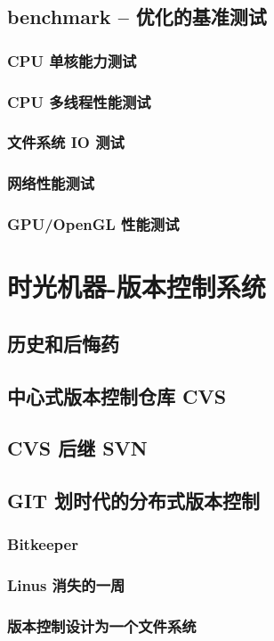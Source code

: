 \documentclass[amstex,twoside]{ctexbook}
\begin{document}
\section{  benchmark – 优化的基准测试}
\subsection{  CPU 单核能力测试}
\subsection{  CPU 多线程性能测试}
\subsection{  文件系统 IO 测试}
\subsection{  网络性能测试}
\subsection{  GPU/OpenGL 性能测试}


\chapter{时光机器-版本控制系统}\label{chap:VCS}
\section{   历史和后悔药	}
\section{   中心式版本控制仓库 CVS	}
\section{   CVS 后继 SVN	}
\section{GIT 划时代的分布式版本控制\label{sec:git}}
\subsection{  Bitkeeper	}
\subsection{  Linus 消失的一周	}
\subsection{  版本控制设计为一个文件系统	}
\end{document}
